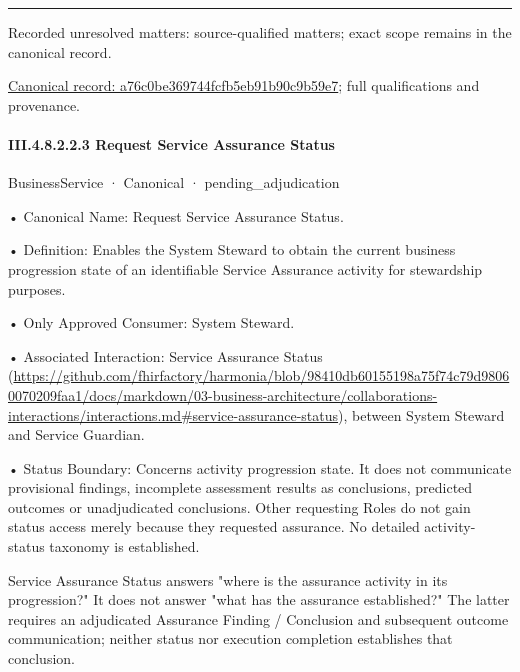 \medskip\hrule\medskip

{\small Recorded unresolved matters: source-qualified matters; exact scope remains in the canonical record.}\par
{\footnotesize \href{../../../../continuum/business/business-service/a76c0be369744fcfb5eb91b90c9b59e7.md}{Canonical record: a76c0be369744fcfb5eb91b90c9b59e7}; full qualifications and provenance.}\par
\paragraph*{III.4.8.2.2.3 Request Service Assurance Status}
\label{navigation:III.4.8.2.2.3}

\label{element:60f8cbc814614f669f31d4e78734c6d6}
{\small BusinessService · Canonical · pending\_adjudication}\par

•
Canonical Name: Request Service Assurance Status.



•
Definition: Enables the System Steward to obtain the current business progression state of an identifiable Service Assurance activity for stewardship purposes.



•
Only Approved Consumer: System Steward.



•
Associated Interaction: Service Assurance Status (\url{https://github.com/fhirfactory/harmonia/blob/98410db60155198a75f74c79d98060070209faa1/docs/markdown/03-business-architecture/collaborations-interactions/interactions.md#service-assurance-status}), between System Steward and Service Guardian.



•
Status Boundary: Concerns activity progression state. It does not communicate provisional findings, incomplete assessment results as conclusions, predicted outcomes or unadjudicated conclusions. Other requesting Roles do not gain status access merely because they requested assurance. No detailed activity-status taxonomy is established.



Service Assurance Status answers "where is the assurance activity in its progression?" It does not answer "what has the assurance established?" The latter requires an adjudicated Assurance Finding / Conclusion and subsequent outcome communication; neither status nor execution completion establishes that conclusion.



